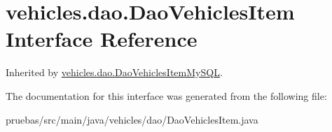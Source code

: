 \hypertarget{interfacevehicles_1_1dao_1_1_dao_vehicles_item}{}\section{vehicles.\+dao.\+Dao\+Vehicles\+Item Interface Reference}
\label{interfacevehicles_1_1dao_1_1_dao_vehicles_item}


Inherited by \mbox{\hyperlink{classvehicles_1_1dao_1_1_dao_vehicles_item_my_s_q_l}{vehicles.\+dao.\+Dao\+Vehicles\+Item\+My\+S\+QL}}.



The documentation for this interface was generated from the following file\+:\begin{DoxyCompactItemize}
\item 
pruebas/src/main/java/vehicles/dao/Dao\+Vehicles\+Item.\+java\end{DoxyCompactItemize}
